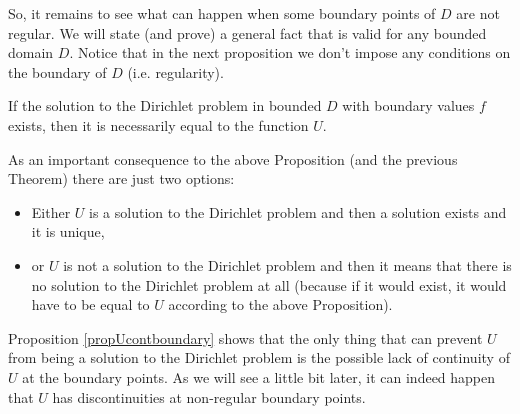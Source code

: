 \documentclass[../mainfile.tex]{subfiles}
\begin{document}
So, it remains to see what can happen when some boundary points of $D$ are not regular. We will state (and prove) a general fact that is valid for any bounded domain $D$. Notice that in the next proposition we don't impose any conditions on the boundary of $D$ (i.e. regularity).
\newpage
\begin{prop} If the solution to the Dirichlet problem in bounded $D$ with boundary values $f$ exists, then it is necessarily equal to the function $U$. 
\end{prop}
As an important consequence to the above Proposition (and the previous Theorem) there are just two options:
\begin{itemize}
 \item Either $U$ is a solution to the Dirichlet problem and then a solution exists and it is unique, 
 \item or $U$ is not a solution to the Dirichlet problem and then it means that there is no solution to the Dirichlet problem at all (because if it would exist, it would have to be equal to $U$ according to the above Proposition).
\end{itemize}
  Proposition \ref{propUcontboundary} shows that the only thing that can prevent $U$ from being a solution to the Dirichlet problem is the possible lack of continuity of $U$ at the boundary points. As we will see a little bit later, it can indeed happen that $U$ has discontinuities at non-regular boundary points. 
\end{document}
